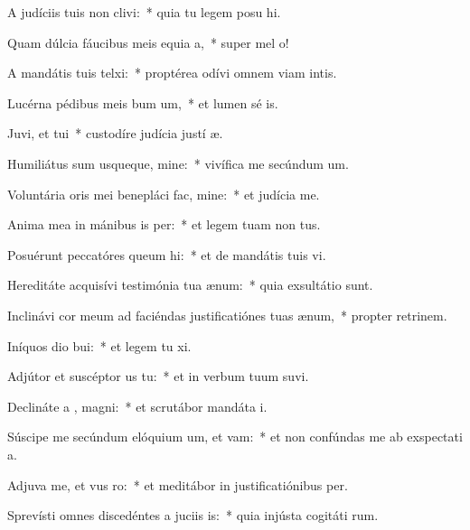 \item A judíciis tuis non clivi:~* quia tu legem posu hi.
\item Quam dúlcia fáucibus meis equia a,~* super mel  o!
\item A mandátis tuis telxi:~* proptérea odívi omnem viam intis.
\item Lucérna pédibus meis bum um,~* et lumen sé is.
\item Juvi, et tui~* custodíre judícia justí æ.
\item Humiliátus sum usqueque, mine:~* vivífica me secúndum  um.
\item Voluntária oris mei benepláci fac, mine:~* et judícia   me.
\item Anima mea in mánibus is per:~* et legem tuam non  tus.
\item Posuérunt peccatóres queum hi:~* et de mandátis tuis  vi.
\item Hereditáte acquisívi testimónia tua  ænum:~* quia exsultátio   sunt.
\item Inclinávi cor meum ad faciéndas justificatiónes tuas  ænum,~* propter retrinem.
\item Iníquos dio bui:~* et legem tu xi.
\item Adjútor et suscéptor us  tu:~* et in verbum tuum suvi.
\item Declináte a , magni:~* et scrutábor mandáta  i.
\item Súscipe me secúndum elóquium um, et vam:~* et non confúndas me ab exspectati a.
\item Adjuva me, et vus ro:~* et meditábor in justificatiónibus  per.
\item Sprevísti omnes discedéntes a juciis is:~* quia injústa cogitáti rum.
